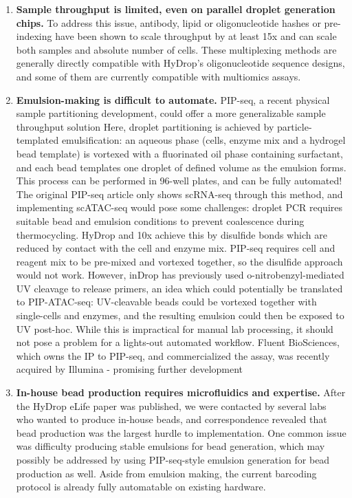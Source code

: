 \begin{enumerate}[noitemsep]
    \item \textbf{Sample throughput is limited, even on parallel droplet generation chips.} To address this issue, antibody, lipid or oligonucleotide hashes or pre-indexing have been shown to scale throughput by at least 15x and can scale both samples and absolute number of cells. These multiplexing methods are generally directly compatible with HyDrop's oligonucleotide sequence designs, and some of them are currently compatible with multiomics assays.
    \item \textbf{Emulsion-making is difficult to automate.} PIP-seq, a recent physical sample partitioning development, could offer a more generalizable sample throughput solution Here, droplet partitioning is achieved by particle-templated emulsification: an aqueous phase (cells, enzyme mix and a hydrogel bead template) is vortexed with a fluorinated oil phase containing surfactant, and each bead templates one droplet of defined volume as the emulsion forms. This process can be performed in 96-well plates, and can be fully automated! The original PIP-seq article only shows scRNA-seq through this method, and implementing scATAC-seq would pose some challenges: droplet PCR requires suitable bead and emulsion conditions to prevent coalescence during thermocycling. HyDrop and 10x achieve this by disulfide bonds which are reduced by contact with the cell and enzyme mix. PIP-seq requires cell and reagent mix to be pre-mixed and vortexed together, so the disulfide approach would not work. However, inDrop has previously used o-nitrobenzyl-mediated UV cleavage to release primers, an idea which could potentially be translated to PIP-ATAC-seq: UV-cleavable beads could be vortexed together with single-cells and enzymes, and the resulting emulsion could then be exposed to UV post-hoc. While this is impractical for manual lab processing, it should not pose a problem for a lights-out automated workflow. Fluent BioSciences, which owns the IP to PIP-seq, and commercialized the assay, was recently acquired by Illumina - promising further development
    \item \textbf{In-house bead production requires microfluidics and expertise.} After the HyDrop eLife paper was published, we were contacted by several labs who wanted to produce in-house beads, and correspondence revealed that bead production was the largest hurdle to implementation. One common issue was difficulty producing stable emulsions for bead generation, which may possibly be addressed by using PIP-seq-style emulsion generation for bead production as well. Aside from emulsion making, the current barcoding protocol is already fully automatable on existing hardware.
\end{enumerate}

